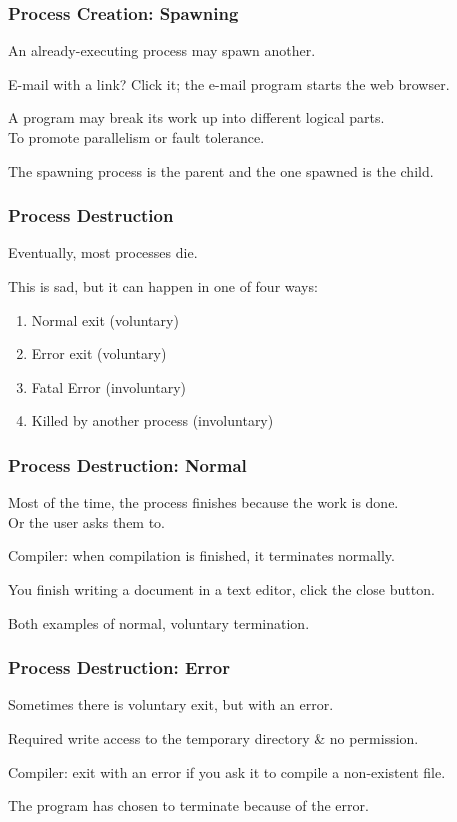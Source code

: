 \begin{frame}
	\frametitle{Process Creation: Spawning}

	An already-executing process may spawn another.

	E-mail with a link? Click it; the e-mail program starts the web browser.

	A program may break its work up into different logical parts.\\
	\quad To promote parallelism or fault tolerance.

	The spawning process is the \alert{parent} and the one spawned is the \alert{child}.


\end{frame}

\begin{frame}
	\frametitle{Process Destruction}

	Eventually, most processes die.

	This is sad, but it can happen in one of four ways:
	\begin{enumerate}
		\item Normal exit (voluntary)
		\item Error exit (voluntary)
		\item Fatal Error (involuntary)
		\item Killed by another process (involuntary)
	\end{enumerate}


\end{frame}

\begin{frame}
	\frametitle{Process Destruction: Normal}

	Most of the time, the process finishes because the work is done.\\
	\quad Or the user asks them to.

	Compiler: when compilation is finished, it terminates normally.

	You finish writing a document in a text editor, click the close button.

	Both examples of normal, voluntary termination.

\end{frame}

\begin{frame}
	\frametitle{Process Destruction: Error}

	Sometimes there is voluntary exit, but with an error.

	Required write access to the temporary directory \& no permission.

	Compiler: exit with an error if you ask it to compile a non-existent file.

	The program has chosen to terminate because of the error.

\end{frame}

